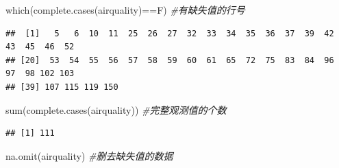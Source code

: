 \documentclass[
]{book}
\newenvironment{Shaded}{\begin{snugshade}}{\end{snugshade}}
\newcommand{\CommentTok}[1]{\textcolor[rgb]{0.56,0.35,0.01}{\textit{#1}}}
\newcommand{\FunctionTok}[1]{\textcolor[rgb]{0.00,0.00,0.00}{#1}}
\newcommand{\NormalTok}[1]{#1}
\newcommand{\SpecialCharTok}[1]{\textcolor[rgb]{0.00,0.00,0.00}{#1}}
\begin{document}
\begin{Shaded}
\begin{Highlighting}[]
\FunctionTok{which}\NormalTok{(}\FunctionTok{complete.cases}\NormalTok{(airquality)}\SpecialCharTok{==}\NormalTok{F) }\CommentTok{\#有缺失值的行号}
\end{Highlighting}
\end{Shaded}

\begin{verbatim}
##  [1]   5   6  10  11  25  26  27  32  33  34  35  36  37  39  42  43  45  46  52
## [20]  53  54  55  56  57  58  59  60  61  65  72  75  83  84  96  97  98 102 103
## [39] 107 115 119 150
\end{verbatim}

\begin{Shaded}
\begin{Highlighting}[]
\FunctionTok{sum}\NormalTok{(}\FunctionTok{complete.cases}\NormalTok{(airquality)) }\CommentTok{\#完整观测值的个数}
\end{Highlighting}
\end{Shaded}

\begin{verbatim}
## [1] 111
\end{verbatim}

\begin{Shaded}
\begin{Highlighting}[]
\FunctionTok{na.omit}\NormalTok{(airquality) }\CommentTok{\#删去缺失值的数据}
\end{Highlighting}
\end{Shaded}
\end{document}
